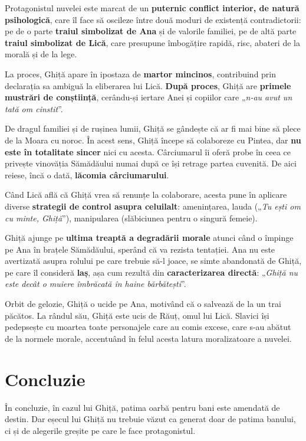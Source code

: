 \documentclass{article}
\newcommand{\qu}[1]{„\emph{#1}”}
\begin{document}
Protagonistul nuvelei este marcat de un \textbf{puternic conflict interior, de natură psihologică}, care îl face să oscileze între două moduri de existență contradictorii: pe de o parte \textbf{traiul simbolizat de Ana} și de valorile familiei, pe de altă parte \textbf{traiul simbolizat de Lică}, care presupune îmbogățire rapidă, risc, abateri de la morală și de la lege.

La proces, Ghiță apare în ipostaza de \textbf{martor mincinos}, contribuind prin declarația sa ambiguă la eliberarea lui Lică. \textbf{După proces}, Ghiță are \textbf{primele mustrări de conștiință}, cerându-și iertare Anei și copiilor care \qu{n-au avut un tată om cinstit}.

De dragul familiei și de rușinea lumii, Ghiță se gândește că ar fi mai bine să plece de la Moara cu noroc. În acest sens, Ghiță începe să colaboreze cu Pintea, dar \textbf{nu este în totalitate sincer} nici cu acesta. Cârciumarul îi oferă probe în ceea ce privește vinovăția Sămădăului numai după ce își retrage partea cuvenită. De aici reiese, încă o dată, \textbf{lăcomia cârciumarului}.

Când Lică află că Ghiță vrea să renunțe la colaborare, acesta pune în aplicare diverse \textbf{strategii de control asupra celuilalt}: amenințarea, lauda (\qu{Tu ești om cu minte, Ghiță}), manipularea (slăbiciunea pentru o singură femeie).

Ghiță ajunge pe \textbf{ultima treaptă a degradării morale} atunci când o împinge pe Ana în brațele Sămădăului, sperând că va rezista tentației. Ana nu este avertizată asupra rolului pe care trebuie să-l joace, se simte abandonată de Ghiță, pe care îl consideră \textbf{laș}, așa cum rezultă din \textbf{caracterizarea directă}: \qu{Ghiță nu este decât o muiere îmbrăcată în haine bărbătești}.

Orbit de gelozie, Ghiță o ucide pe Ana, motivând că o salvează de la un trai păcătos. La rândul său, Ghiță este ucis de Răuț, omul lui Lică. Slavici își pedepsește cu moartea toate personajele care au comis excese, care s-au abătut de la normele morale, accentuând în felul acesta latura moralizatoare a nuvelei.

\section{Concluzie}
În concluzie, în cazul lui Ghiță, patima oarbă pentru bani este amendată de destin. Dar eșecul lui Ghiță nu trebuie văzut ca generat doar de patima banului, ci și de alegerile greșite pe care le face protagonistul.
\end{document}
